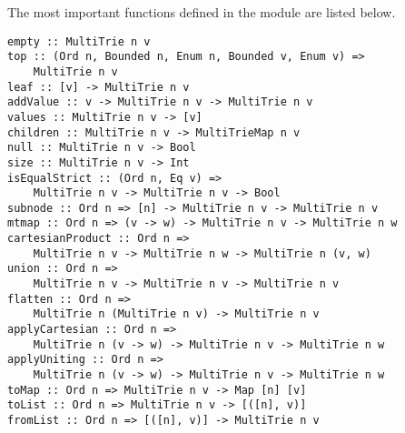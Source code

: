 \documentclass{article}
\theoremstyle{definition}
\begin{document}
The most important functions defined in the module are listed below.

\begin{lstlisting}
empty :: MultiTrie n v
top :: (Ord n, Bounded n, Enum n, Bounded v, Enum v) =>
    MultiTrie n v
leaf :: [v] -> MultiTrie n v
addValue :: v -> MultiTrie n v -> MultiTrie n v
values :: MultiTrie n v -> [v]
children :: MultiTrie n v -> MultiTrieMap n v
null :: MultiTrie n v -> Bool
size :: MultiTrie n v -> Int
isEqualStrict :: (Ord n, Eq v) =>
    MultiTrie n v -> MultiTrie n v -> Bool
subnode :: Ord n => [n] -> MultiTrie n v -> MultiTrie n v
mtmap :: Ord n => (v -> w) -> MultiTrie n v -> MultiTrie n w
cartesianProduct :: Ord n =>
    MultiTrie n v -> MultiTrie n w -> MultiTrie n (v, w)
union :: Ord n =>
    MultiTrie n v -> MultiTrie n v -> MultiTrie n v
flatten :: Ord n =>
    MultiTrie n (MultiTrie n v) -> MultiTrie n v
applyCartesian :: Ord n =>
    MultiTrie n (v -> w) -> MultiTrie n v -> MultiTrie n w
applyUniting :: Ord n =>
    MultiTrie n (v -> w) -> MultiTrie n v -> MultiTrie n w
toMap :: Ord n => MultiTrie n v -> Map [n] [v]
toList :: Ord n => MultiTrie n v -> [([n], v)]
fromList :: Ord n => [([n], v)] -> MultiTrie n v
\end{lstlisting}
\end{document}
